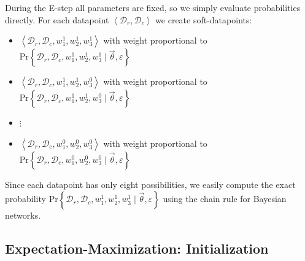 \documentclass[10pt,twocolumn]{article}
\newcommand{\prb}[1]{\ensuremath{  \mathrm{Pr}\left\{ #1 \right\}  }}
\begin{document}
During the E-step all parameters are fixed, so we simply evaluate probabilities directly.
For each datapoint $\left< \mathcal{D}_r, \mathcal{D}_c \right>$ we create soft-datapoints:
\begin{itemize}
\item $\left< \mathcal{D}_r, \mathcal{D}_c, w_1^1, w_2^1, w_3^1 \right>$  with weight proportional to $\prb{\mathcal{D}_r, \mathcal{D}_c, w_1^1, w_2^1, w_3^1 \mid \vec \theta,\varepsilon}$
\item $\left< \mathcal{D}_r, \mathcal{D}_c, w_1^1, w_2^1, w_3^0 \right>$  with weight proportional to $\prb{\mathcal{D}_r, \mathcal{D}_c, w_1^1, w_2^1, w_3^0\mid \vec \theta,\varepsilon}$
\item $\vdots$
\item $\left< \mathcal{D}_r, \mathcal{D}_c, w_1^0, w_2^0, w_3^0 \right>$  with weight proportional to $\prb{\mathcal{D}_r, \mathcal{D}_c, w_1^0, w_2^0, w_3^0\mid \vec \theta, \varepsilon}$
\end{itemize}

Since each datapoint has only eight possibilities, we easily compute the exact probability $\prb{\mathcal{D}_r, \mathcal{D}_c, w_1^1, w_2^1, w_3^1 \mid \vec \theta,\varepsilon}$ using the chain rule for Bayesian networks.
\subsection{Expectation-Maximization: Initialization}
\end{document}
